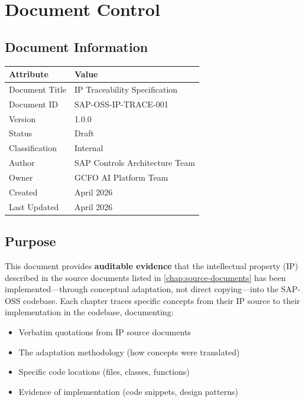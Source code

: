 
\chapter*{Document Control}

\section*{Document Information}

\begin{tabularx}{\textwidth}{@{}lX@{}}
\toprule
\textbf{Attribute} & \textbf{Value} \\
\midrule
Document Title & IP Traceability Specification \\
Document ID & SAP-OSS-IP-TRACE-001 \\
Version & 1.0.0 \\
Status & Draft \\
Classification & Internal \\
Author & SAP Controls Architecture Team \\
Owner & GCFO AI Platform Team \\
Created & April 2026 \\
Last Updated & April 2026 \\
\bottomrule
\end{tabularx}

\section*{Purpose}

This document provides \textbf{auditable evidence} that the intellectual property (IP) described in the source documents listed in \cref{chap:source-documents} has been implemented---through conceptual adaptation, not direct copying---into the SAP-OSS codebase. Each chapter traces specific concepts from their IP source to their implementation in the codebase, documenting:

\begin{itemize}[nosep]
    \item Verbatim quotations from IP source documents
    \item The adaptation methodology (how concepts were translated)
    \item Specific code locations (files, classes, functions)
    \item Evidence of implementation (code snippets, design patterns)
\end{itemize}


